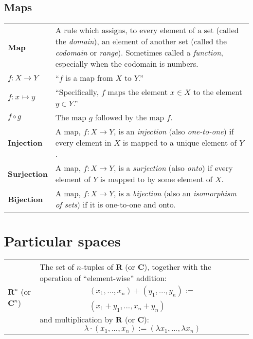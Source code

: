 \documentclass[10pt, a4paper, twocolumn]{article}
\newcommand{\defn}[1]{\textbf{\textsf{#1}}}
\newcommand{\set}[1]{\mathbold{#1}}
\begin{document}
\newpage
\subsection*{Maps}
\begin{tabularx}{\columnwidth}{@{}p{}>{\raggedright\arraybackslash}X@{}}
  \toprule
  \defn{Map} & A rule which assigns, to every element of a set (called the \emph{domain}), an element of another set (called the \emph{codomain} or \emph{range}). Sometimes called a \emph{function}, especially when the codomain is numbers. \\

  $f:X\to Y$   & ``$f$ is a map from $X$ to $Y$.'' \\

  $f:x \mapsto y$  & ``Specifically, $f$ maps the element $x \in X$ to the
  element $y \in Y$.'' \\
  $f \circ g$    & The map $g$ followed by the map $f$. \\

  \defn{Injection} & A map, $f:X \to Y$, is an \emph{injection} (also \emph{one-to-one}) if every element in $X$ is mapped to a unique element of $Y$. \\

  \defn{Surjection} & A map, $f:X \to Y$, is a \emph{surjection} (also \emph{onto}) if every element of $Y$ is mapped to by some element of $X$. \\

  \defn{Bijection} & A map, $f:X \to Y$, is a \emph{bijection} (also an \emph{isomorphism of sets}) if it is one-to-one and onto.   
\end{tabularx}

\section*{Particular spaces}
\begin{tabularx}{\columnwidth}{@{}p{}>{\raggedright\arraybackslash}X@{}}
  \toprule
  $\set{R}^n$ (or $\set{C}^n$) & The set of $n$-tuples of $\set{R}$ (or $\set{C}$), together with the operation of “element-wise” addition:
  \begin{multline*}
      (x_1, \dotsc, x_n) + (y_1, \dotsc, y_n) := \\ (x_1+y_1, \dotsc, x_n+y_n) 
  \end{multline*}
  and multiplication by $\set{R}$ (or $\set{C}$):
  \begin{equation*}
    \lambda \cdot (x_1, \dotsc, x_n) := (\lambda x_1, \dotsc, \lambda x_n) 
  \end{equation*}
\end{tabularx}
\end{document}
